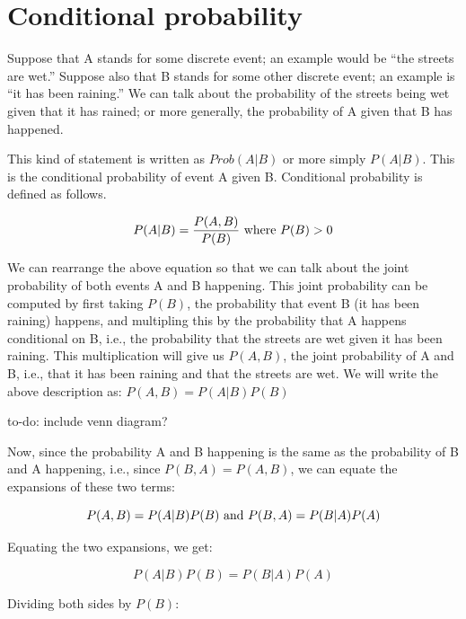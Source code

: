 \documentclass[12pt,]{krantz}
\makeatletter
\newenvironment{kframe}{%
\medskip{}
\setlength{\fboxsep}{.8em}
 \def\at@end@of@kframe{}%
 \ifinner\ifhmode%
  \def\at@end@of@kframe{\end{minipage}}%
  \begin{minipage}{\columnwidth}%
 \fi\fi%
 \def\FrameCommand##1{\hskip\@totalleftmargin \hskip-\fboxsep
 \colorbox{shadecolor}{##1}\hskip-\fboxsep
     \hskip-\linewidth \hskip-\@totalleftmargin \hskip\columnwidth}%
 \MakeFramed {\advance\hsize-\width
   \@totalleftmargin\z@ \linewidth\hsize
   \@setminipage}}%
 {\par\unskip\endMakeFramed%
 \at@end@of@kframe}
\newenvironment{rmdblock}[1]
  {
  \begin{itemize}
  \renewcommand{\labelitemi}{
    \raisebox{-.7\height}[0pt][0pt]{
      {\setkeys{Gin}{width=3em,keepaspectratio}\texttt{[image: images/\#1]}}
    }
  }
  \setlength{\fboxsep}{1em}
  \begin{kframe}
  \item
  }
  {
  \end{kframe}
  \end{itemize}
  }
\newenvironment{rmdnote}
  {\begin{rmdblock}{note}}
  {\end{rmdblock}}
\theoremstyle{definition}
\theoremstyle{definition}
\theoremstyle{definition}
\theoremstyle{remark}
\makeatother
\begin{document}
\section{Conditional probability}\label{conditional-probability}

Suppose that A stands for some discrete event; an example would be ``the
streets are wet.'' Suppose also that B stands for some other discrete
event; an example is ``it has been raining.'' We can talk about the
probability of the streets being wet given that it has rained; or more
generally, the probability of A given that B has happened.

This kind of statement is written as \(Prob(A|B)\) or more simply
\(P(A|B)\). This is the conditional probability of event A given B.
Conditional probability is defined as follows.

\begin{equation} 
P(A|B)= \frac{P(A,B)}{P(B)} \hbox{ where } P(B)>0
\end{equation}

We can rearrange the above equation so that we can talk about the joint
probability of both events A and B happening. This joint probability can
be computed by first taking \(P(B)\), the probability that event B (it
has been raining) happens, and multipling this by the probability that A
happens conditional on B, i.e., the probability that the streets are wet
given it has been raining. This multiplication will give us \(P(A,B)\),
the joint probability of A and B, i.e., that it has been raining and
that the streets are wet. We will write the above description as:
\(P(A,B)=P(A|B)P(B)\)

\begin{rmdnote} to-do: include venn diagram?
\end{rmdnote}

Now, since the probability A and B happening is the same as the
probability of B and A happening, i.e., since \(P(B,A)=P(A,B)\), we can
equate the expansions of these two terms:

\begin{equation}
P(A,B) = P(A|B) P(B) \hbox{ and } P(B,A) = P(B|A)P(A) 
\end{equation}

Equating the two expansions, we get:

\begin{equation}
P(A|B) P(B) = P(B|A)P(A) 
\end{equation}

Dividing both sides by \(P(B)\):
\end{document}
